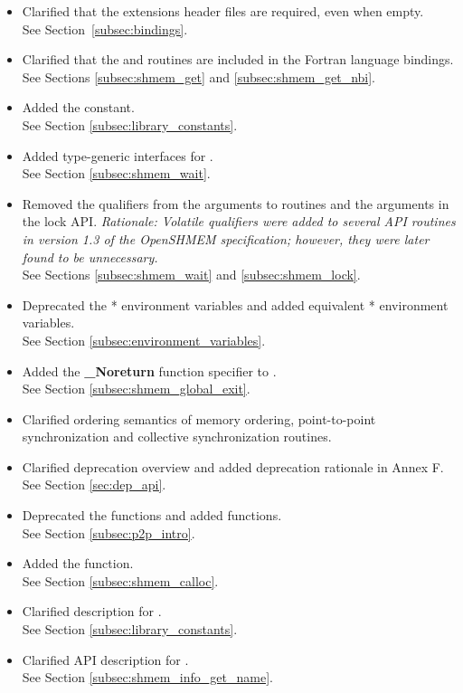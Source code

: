 \begin{itemize}

\item Clarified that the \openshmem extensions header files are required, even when empty.
\\See Section~\ref{subsec:bindings}.
%
\item Clarified that the  and 
    routines are included in the Fortran language bindings.\\
    See Sections \ref{subsec:shmem_get} and \ref{subsec:shmem_get_nbi}.
%
\item Added the  constant.
\\See Section \ref{subsec:library_constants}.
%
\item Added type-generic interfaces for .
\\ See Section \ref{subsec:shmem_wait}.
%
\item Removed the  qualifiers from the  arguments to
 routines and the  arguments in the lock API.
\emph{Rationale: Volatile qualifiers were added to several API routines in
version 1.3 of the OpenSHMEM specification; however, they were later found
to be unnecessary.}
\\ See Sections \ref{subsec:shmem_wait} and \ref{subsec:shmem_lock}.
%
\item Deprecated the * environment variables and added equivalent
* environment variables.
\\ See Section \ref{subsec:environment_variables}.
%
\item Added the \Cstd[11] \textbf{\_Noreturn} function specifier to
.
\\ See Section \ref{subsec:shmem_global_exit}.
%
\item Clarified ordering semantics of memory ordering, point-to-point synchronization and collective 
synchronization routines.
%
\item Clarified deprecation overview and added deprecation rationale in Annex F.
\\See Section \ref{sec:dep_api}.
%
\item Deprecated the  functions and added 
      functions.
\\ See Section \ref{subsec:p2p_intro}.
%
\item Added the  function.
\\ See Section \ref{subsec:shmem_calloc}.
%
\item Clarified description for .
\\See Section \ref{subsec:library_constants}.
%
\item Clarified API description for .
\\See Section \ref{subsec:shmem_info_get_name}.
%
\end{itemize}

